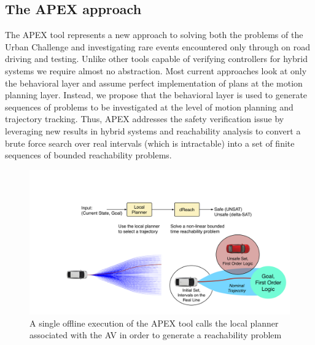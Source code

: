  \subsection{The APEX approach}
 The APEX tool represents a new approach to solving both the problems of the Urban Challenge and investigating rare events encountered only through on road driving and testing. Unlike other tools capable of verifying controllers for hybrid systems we require almost no abstraction. Most current approaches look at only the behavioral layer and assume perfect implementation of plans at the motion planning layer. Instead, we propose that the behavioral layer is used to generate sequences of problems to be investigated at the level of motion planning and trajectory tracking.  Thus, APEX addresses the safety verification issue by leveraging new results in hybrid systems and reachability analysis \cite{gao2013satisfiability} to convert a brute force search over real intervals (which is intractable) into a set of finite sequences of bounded reachability problems. 
 \begin{figure}
 	\includegraphics[width=\columnwidth]{Figures/tool_single}
 	\caption{A single offline execution of the APEX tool calls the local planner associated with the AV in order to generate a reachability problem}
 \end{figure}
 
